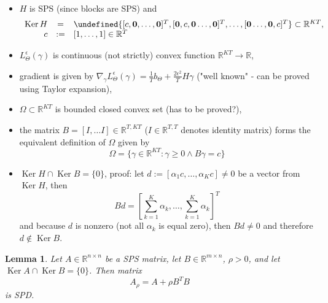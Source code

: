 \documentclass{article}
\newtheorem{lemma}{Lemma}
\DeclareMathOperator{\Ker}{Ker}
\let\span\undefined
\DeclareMathOperator{\span}{span}
\begin{document}
\begin{itemize}
\item $H$ is SPS (since blocks are SPS) and
 \begin{equation}
  \label{eq:kerH}
  \begin{array}{rcl}  
   \Ker H & = & \span \lbrace [c, {\bf 0}, \dots, {\bf 0}]^T, [{\bf 0}, c, {\bf 0} \dots, {\bf 0}]^T, \dots, [{\bf 0} \dots, {\bf 0}, c]^T \rbrace \subset \mathbb{R}^{KT}, \\
   c & := & [ 1, \dots, 1] \in \mathbb{R}^T
  \end{array}
 \end{equation}
\item $L^{\epsilon}_{\Theta}(\gamma)$ is continuous (not strictly) convex function $\mathbb{R}^{KT} \rightarrow \mathbb{R}$,
\item gradient is given by $\nabla_{\gamma} L^{\epsilon}_{\Theta}(\gamma) = \frac{1}{T} b_{\Theta} + \frac{2\epsilon^2}{T} H \gamma$ ("well known" - can be proved using Taylor expansion),
\item $\Omega \subset \mathbb{R}^{KT}$ is bounded closed convex set {\color{red}(has to be proved?)},
\item the matrix $B = [I, \dots I] \in \mathbb{R}^{T,KT}$ ($I \in \mathbb{R}^{T,T}$ denotes identity matrix) forms the equivalent definition of $\Omega$ given by
 \begin{displaymath}
  \Omega = \lbrace \gamma \in \mathbb{R}^{KT}: \gamma \geq 0 \wedge B\gamma = c \rbrace
 \end{displaymath}
\item $\Ker H \cap \Ker B = \lbrace 0 \rbrace$, proof: let $d := [\alpha_1 c, \dots, \alpha_K c] \neq 0$ be a vector from $\Ker H$, then
\begin{displaymath}
 Bd = \left[\sum\limits_{k=1}^K \alpha_k, \dots, \sum\limits_{k=1}^K \alpha_k \right]^T
\end{displaymath}
and because $d$ is nonzero (not all $\alpha_k$ is equal zero), then $Bd \neq 0$ and therefore $d \notin \Ker B$.
\end{itemize}

\begin{lemma}
\label{th:penalized}
Let $A \in \mathbb{R}^{n \times n}$ be a SPS matrix, let $B \in \mathbb{R}^{m \times n}$, $\rho > 0$, and let $\Ker A \cap \Ker B = \lbrace 0 \rbrace$.
Then matrix
\begin{displaymath}
A_{\rho} = A + \rho B^T B
\end{displaymath}
is SPD.
\end{lemma}
\end{document}
